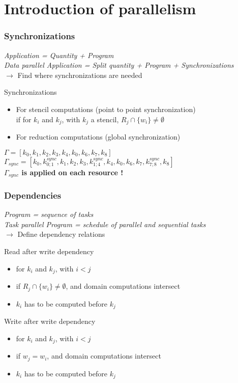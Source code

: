 \documentclass{beamer}
\begin{document}
\section{Introduction of parallelism}
\begin{frame}
\frametitle{Synchronizations}
\textit{\footnotesize Application = Quantity + Program\\
Data parallel Application = Split quantity + Program + Synchronizations\\}
\normalsize $\rightarrow$ Find where synchronizations are needed
\begin{block}{Synchronizations}
\begin{itemize}
\item For stencil computations (point to point synchronization)\\
      if for $k_i$ and $k_j$, with $k_j$ a stencil, $R_j \cap \{w_i\} \neq \emptyset$
\item For reduction computations (global synchronization)\\
\end{itemize}
\end{block}
$\Gamma = [k_0,k_1,k_2,k_3,k_4,k_0,k_6,k_7,k_8]$\\
\textbf{$\Gamma_{sync} = [k_0,k_{0;1}^{sync},k_1,k_2,k_3,k_{1;4}^{sync},k_4,k_0,k_6,k_7,k_{7;8}^{sync},k_8]$}\\
\textbf{$\Gamma_{sync}$ is applied on each resource !}
\end{frame}
\begin{frame}
\frametitle{Dependencies}
\textit{\footnotesize Program = sequence of tasks\\
Task parallel Program = schedule of parallel and sequential tasks}\\
\normalsize $\rightarrow$ Define dependency relations
\begin{block}{Read after write dependency}
\begin{itemize}
\item for $k_i$ and $k_j$, with $i < j$
\item if $R_j \cap \{w_i\} \neq \emptyset$, and domain computations intersect
\item $k_i$ has to be computed before $k_j$
\end{itemize}
\end{block}
\begin{block}{Write after write dependency}
\begin{itemize}
\item for $k_i$ and $k_j$, with $i < j$
\item if $w_j = w_i$, and domain computations intersect
\item $k_i$ has to be computed before $k_j$
\end{itemize}
\end{block}
\end{frame}
\end{document}
